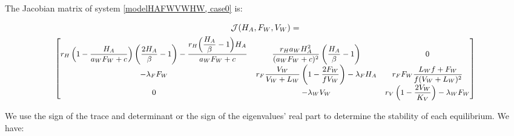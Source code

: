 \documentclass{article}
\newcommand{\lfw}{\lambda_{F}}
\newcommand{\lfv}{\lambda_{W}}
\begin{document}
The Jacobian matrix of system \eqref{modelHAFWVWHW, case0} is:

\begin{multline}
\mathcal{J}(H_A,F_W,V_W) = \\
{\small
\begin{bmatrix}
r_H \left(1-\dfrac{H_A}{a_W F_W +c} \right)\left(\dfrac{2H_A}{\beta}-1\right) - \dfrac{r_H \Big(\dfrac{H_A}{\beta}-1\Big)H_A}{a_WF_W + c} & \dfrac{r_H a_W H_A^2}{(a_WF_W + c)^2} \left(\dfrac{H_A}{\beta}-1\right) & 0\\
-\lfw F_W & r_F \dfrac{V_W}{V_W + L_W} \left(1 - \dfrac{2F_W}{fV_W}\right) -\lfw H_A  & r_F F_W \dfrac{L_W f + F_W}{f (V_W + L_W)^2} \\
0 & -\lfv V_W & r_V \left(1 - \dfrac{2V_W}{K_V}\right) - \lfv F_W
\end{bmatrix}}
\end{multline}


We use the sign of the trace and determinant or the sign of the eigenvalues' real part to determine the stability of each equilibrium. We have:
\end{document}

